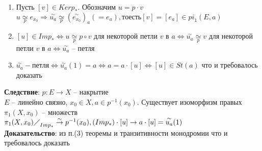 	\begin{enumerate}
		\item Пусть $[v] \in Ker p_{\ast}$. Обозначим $u = p\cdot v$\\
		$u \underset{p}{\simeq} e_{x_0} \Rightarrow \overset{\sim}{u_a} \underset{p}{\simeq} {(\overset{\sim}{e_{x_0}})}_a ( = e_a), то есть [v] = [e_a] \in {pi}_1 (E,a)$
		\item $[u]\in Im p_{\ast} \Leftrightarrow u \underset{p}{\simeq} p \circ v$ для некоторой петли $v$ в $a \Leftrightarrow \overset{\sim}{u_a} \underset{p}{\simeq} v$ для некоторой петли $v$ в $a \Leftrightarrow \overset{\sim}{u_a}$ -- петля
		\item $\overset{\sim}{u_a} -петля \Leftrightarrow \overset{\sim}{u_a} (1) = a \Leftrightarrow a = a\cdot [u] \Leftrightarrow [u] \in St(a)$ что и требовалось доказать
	\end{enumerate}
	\textbf{Следствие}: $p: E\rightarrow X$ -- накрытие\\
	$E$ -- линейно связно, $x_0 \in X, a\in p^{-1} (x_0)$. Существует изоморфизм правых ${\pi}_1 (X,x_0)$ -- множеств\\
	${{\pi}_1 (X,x_0) \diagup}_{Im p_{\ast}} \overset{\sim}{\rightarrow} p^{-1} (x_0), (Im p_{\ast})\cdot [u] \rightarrow a\cdot [u] = \overset{\sim}{u_a} (1)$\\
	\textbf{Доказательство}: из п.(3) теоремы и транзитивности монодромии что и требовалось доказать
		
	
	
\newpage
